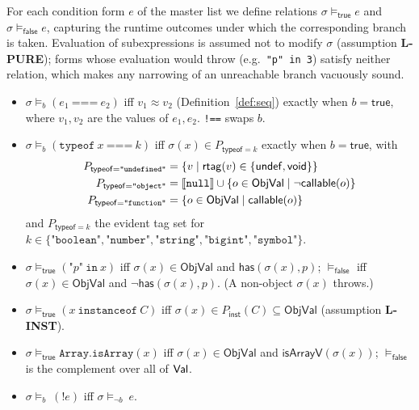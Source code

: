 \documentclass[11pt]{article}
\newcommand{\ObjVal}{\mathsf{ObjVal}}
\newcommand{\rtag}{\mathsf{rtag}}
\begin{document}
\begin{definition}
\label{def:eval}
For each condition form $e$ of the master list we define relations
$\sigma \models_{\mathsf{true}} e$ and $\sigma \models_{\mathsf{false}} e$,
capturing the runtime outcomes under which the corresponding branch is taken.
Evaluation of subexpressions is assumed not to modify $\sigma$
(assumption \textbf{L-PURE}); forms whose evaluation would throw (e.g.\
\texttt{"p" in 3}) satisfy neither relation, which makes any narrowing of an
unreachable branch vacuously sound.
\begin{itemize}
\item $\sigma \models_b (e_1\ \texttt{===}\ e_2)$ iff $v_1 \approx v_2$
  (Definition~\ref{def:seq}) exactly when $b = \mathsf{true}$, where
  $v_1, v_2$ are the values of $e_1, e_2$. \texttt{!==} swaps $b$.
\item $\sigma \models_b (\texttt{typeof}\ x\ \texttt{===}\ k)$ iff
  $\sigma(x) \in P_{\mathsf{typeof}=k}$ exactly when $b = \mathsf{true}$,
  with
  \begin{align*}
  P_{\mathsf{typeof}=\texttt{"undefined"}} &=
    \{v \mid \rtag(v) \in \{\mathsf{undef},\mathsf{void}\}\} \\
  P_{\mathsf{typeof}=\texttt{"object"}} &=
    \sem{\texttt{null}} \cup \{o \in \ObjVal \mid \neg\mathsf{callable}(o)\}\\
  P_{\mathsf{typeof}=\texttt{"function"}} &=
    \{o \in \ObjVal \mid \mathsf{callable}(o)\}
  \end{align*}
  and $P_{\mathsf{typeof}=k}$ the evident tag set for
  $k \in \{\texttt{"boolean"},\texttt{"number"},\texttt{"string"},
  \texttt{"bigint"},\texttt{"symbol"}\}$.
\item $\sigma \models_{\mathsf{true}} (\texttt{"}p\texttt{"}\ \texttt{in}\ x)$
  iff $\sigma(x) \in \ObjVal$ and $\mathsf{has}(\sigma(x), p)$;
  $\models_{\mathsf{false}}$ iff $\sigma(x) \in \ObjVal$ and
  $\neg\mathsf{has}(\sigma(x), p)$. (A non-object $\sigma(x)$ throws.)
\item $\sigma \models_{\mathsf{true}} (x\ \texttt{instanceof}\ C)$ iff
  $\sigma(x) \in P_{\mathsf{inst}}(C) \subseteq \ObjVal$
  (assumption \textbf{L-INST}).
\item $\sigma \models_{\mathsf{true}} \texttt{Array.isArray}(x)$ iff
  $\sigma(x) \in \ObjVal$ and $\mathsf{isArrayV}(\sigma(x))$;
  $\models_{\mathsf{false}}$ is the complement over all of $\mathsf{Val}$.
\item $\sigma \models_b\ (\texttt{!}e)$ iff $\sigma \models_{\neg b}\ e$.

\end{itemize}
\end{definition}
\end{document}
